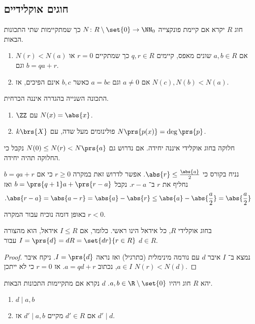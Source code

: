 \documentclass[a4paper,10pt,twoside,openany]{book}
\begin{document}
\subsection{חוגים אוקלידיים}

\begin{definition}
חוג
$R$
יקרא
אם קיימת פונקצייה
$N \colon R \setminus\set{0} \to \NN_{0}$
כך שמתקיימות שתי התכונות הבאות.

\begin{enumerate}
\item
אם
$a,b \in R$
שונים מאפס, קיימים
$q,r \in R$
כך שמתקיים
$r = 0$
או
$N(r) < N(a)$
וגם
$b = qa + r$.
\item
אם
$a \neq 0$
וגם
$a=bc$
כאשר
$b,c$
אינם הפיכים, אז
$N(c),N(b)<N(a)$.
\end{enumerate}
\end{definition}

\begin{remark}
התכונה השנייה בהגדרה איננה הכרחית.
\end{remark}

\begin{examples}
\begin{enumerate}
\item $\ZZ$
עם
$N(x) = \abs{x}$.
\item $k\brs{X}$
פולינומים מעל שדה, עם
$N\prs{p(x)} = \deg\prs{p}$.
\end{enumerate}
\end{examples}
\begin{remark}
חלוקה בחוג אוקלידי איננה יחידה.
אם נדרוש גם
$N(0) \leq N(r) < N\prs{a}$
נקבל כי החלוקה תהיה יחידה.
\end{remark}

נניח בקורס כי
$\abs{r} \leq \frac{\abs{a}}{2}$.
אפשר לדרוש זאת במקרה
$r \geq 0$
כי אם
$b = qa + r$
נחליף את
$r$
ב־%
$r-a$.
נקבל
$b = \prs{q+1}a + \prs{r-a}$
ואז
\begin{align*}
\text{.} \abs{r-a} = \abs{a-r} = \abs{a} - \abs{r} \leq \abs{a} - \abs{\frac{a}{2}} = \abs{\frac{a}{2}}
\end{align*}
באופן דומה נוכיח עבור המקרה
$r < 0$.

\begin{proposition}
בחוג אוקלידי
$R$,
כל אידאל הינו ראשי. כלומר,
אם
$I \leq R$
אידאל, הוא מהצורה
$I = \prs{d} = dR = \set{dr}{r \in R}$
עבור
$d \in R$.
\end{proposition}
\begin{proof}
נמצא ב־%
$I$
איבר
$d$
עם נורמה מינימלית (כתרגיל) ואז נראה
$I = \prs{d}$.
ניקח איבר
$a \in I$,
נכתוב
$a = qd + r$.
אז
$r = 0$
כי לא ייתכן
$N(r) < N(d)$.
\end{proof}
\begin{definition}
יהא%
$R$
חוג ויהיו
$a,b\in \R \setminus \set{0}$.
$d$
נקרא
אם מתקיימות התכונות הבאות.
\begin{enumerate}
\item $d \mid a,b$
\item אם
$d' \in R$
מקיים
$d' \mid a,b$
אז
$d' \mid d$.
\end{enumerate}
\end{definition}
\end{document}
